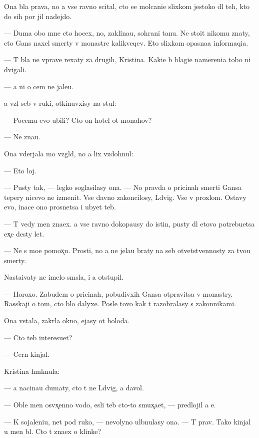 \documentclass[10pt]{book}
\begin{document}
Ona b{\yi}la prava, no {\y}a vse ravno scital, cto {\y}e{\y}e molcani{\y}e slixkom jestoko dl{\ia} teh, kto do sih por jil nadejdo{\y}.

— Duma{\y} obo mne cto hocex, no, zaklina{\y}u, sohrani ta{\y}nu. Ne sto{\y}it nikomu znaty, cto Gans naxel smerty v monast{\yi}re kalikveqev. Eto slixkom opasna{\y}a informaqi{\y}a.

— T{\yi} b{\yi}la ne vprave rexaty za drugih, Kristina. Kaki{\y}e b{\yi} blagi{\y}e namereni{\y}a tobo{\y} ni dvigali.

— {\Y}a ni o cem ne jale{\y}u.

{\Y}a vz{\ia}l seb{\ia} v ruki, otkinuvxisy na stul:

— Pocemu {\y}evo ubili? Cto on hotel ot monahov?

— Ne zna{\y}u.

Ona v{\yi}derjala mo{\y} vzgl{\ia}d, no {\y}a lix vzdohnul:

— Eto loj.

— Pusty tak, — legko soglasilasy ona. — No pravda o pricinah smerti Gansa tepery nicevo ne izmenit. Vse davno zakoncilosy, L{\iu}dvig. Vse v proxlom. Ostavy {\y}evo, inace ono prosnetsa i ubyet teb{\ia}.

— T{\yi} vedy men{\ia} zna{\y}ex. {\Y}a vse ravno dokopa{\y}usy do istin{\yi}, pusty dl{\ia} etovo potrebu{\y}etsa {\y}ex̨e des{\ia}ty let.

— Ne s mo{\y}e{\y} pomox̨{\y}u. Prosti, no {\y}a ne jela{\y}u braty na seb{\ia} otvetstvennosty za tvo{\y}u smerty.

Nasta{\y}ivaty ne imelo sm{\yi}sla, i {\y}a otstupil.

— Horoxo. Zabudem o pricinah, pobudivxih Gansa otpravitsa v monast{\yi}ry. Rasskaji o tom, cto b{\yi}lo dalyxe. Posle tovo kak t{\yi} razobralasy s zakonnikami.

Ona vstala, zakr{\yi}la okno, {\y}ejasy ot holoda.

— Cto teb{\ia} interesu{\y}et?

— Cern{\yi}{\y} kinjal.

Kristina hm{\yi}knula:

— {\Y}a nacina{\y}u dumaty, cto t{\yi} ne L{\iu}dvig, a d{\y}avol.

— Oble{\y} men{\ia} osv{\ia}x̨enno{\y} vodo{\y}, {\y}esli teb{\ia} cto-to smux̨a{\y}et, — predlojil {\y}a {\y}e{\y}.

— K sojaleni{\y}u, net pod ruko{\y}, — nevolyno ul{\yi}bnulasy ona. — T{\yi} prav. Tako{\y} kinjal u men{\ia} b{\yi}l. Cto t{\yi} zna{\y}ex o klinke?
\end{document}
